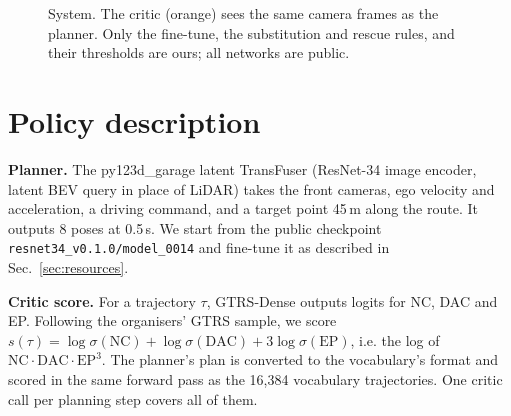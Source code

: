 \documentclass{article}
\begin{document}
\begin{figure}[h]
\centering
{}
\caption{System. The critic (orange) sees the same camera frames as the planner. Only the fine-tune, the
substitution and rescue rules, and their thresholds are ours; all networks are public.}
\label{fig:system}
\end{figure}

\section{Policy description}
\textbf{Planner.} The py123d\_garage latent TransFuser (ResNet-34 image encoder, latent BEV query in place of
LiDAR) takes the front cameras, ego velocity and acceleration, a driving command, and a target point 45\,m
along the route. It outputs 8 poses at 0.5\,s. We start from the public checkpoint \texttt{resnet34\_v0.1.0/model\_0014}
and fine-tune it as described in Sec.~\ref{sec:resources}.

\textbf{Critic score.} For a trajectory $\tau$, GTRS-Dense outputs logits for NC, DAC and EP. Following the
organisers' GTRS sample, we score $s(\tau)=\log\sigma(\mathrm{NC})+\log\sigma(\mathrm{DAC})+3\log\sigma(\mathrm{EP})$,
i.e. the log of $\mathrm{NC}\cdot\mathrm{DAC}\cdot\mathrm{EP}^3$. The planner's plan is converted to the vocabulary's
format and scored in the same forward pass as the 16{,}384 vocabulary trajectories. One critic call per planning step
covers all of them.
\end{document}
